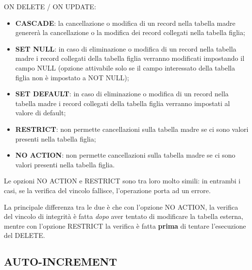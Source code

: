 ON DELETE / ON UPDATE:

\begin{itemize}
\item{\textbf{CASCADE}}: la cancellazione o modifica di un record nella tabella madre genererà la cancellazione o la modifica dei record collegati nella tabella figlia;
\item{\textbf{SET NULL}}: in caso di eliminazione o modifica di un record nella tabella madre i record collegati della tabella figlia verranno modificati impostando il campo NULL (opzione attivabile solo se il campo interessato della tabella figlia non è impostato a NOT NULL);
\item{\textbf{SET DEFAULT}}: in caso di eliminazione o modifica di un record nella tabella madre i record collegati della tabella figlia verranno impostati al valore di default;
\item{\textbf{RESTRICT}}: non permette cancellazioni sulla tabella madre se ci sono valori presenti nella tabella figlia;
\item{\textbf{NO ACTION}}: non permette cancellazioni sulla tabella madre se ci sono valori presenti nella tabella figlia.

\end{itemize}

Le opzioni NO ACTION e RESTRICT sono tra loro molto simili: in entrambi i casi, se la verifica del vincolo fallisce, l'operazione porta ad un errore.

La principale differenza tra le due è che con l'opzione NO ACTION, la verifica del vincolo di integrità è fatta \textit{dopo} aver tentato di modificare la tabella esterna, mentre con l'opzione RESTRICT la verifica è fatta \textbf{prima} di tentare l'esecuzione del DELETE.


\subsection{AUTO-INCREMENT}

